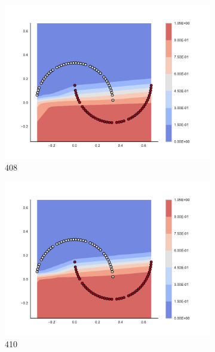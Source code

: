\begin{figure}[h]
\begin{subfigure}[b]{0.09\textwidth}
    \includegraphics[clip, trim=2.35cm 1.75cm 4.5cm 0cm,width=\textwidth]{img/convergence/408.pdf}
    \caption{408}
    \label{fig:convergence_408}
\end{subfigure}
%
\begin{subfigure}[b]{0.09\textwidth}
    \includegraphics[clip, trim=2.35cm 1.75cm 4.5cm 0cm,width=\textwidth]{img/convergence/410.pdf}
    \caption{410}
    \label{fig:convergence_410}
\end{subfigure}
%
\begin{subfigure}[b]{0.09\textwidth}

\end{subfigure}
\end{figure}
